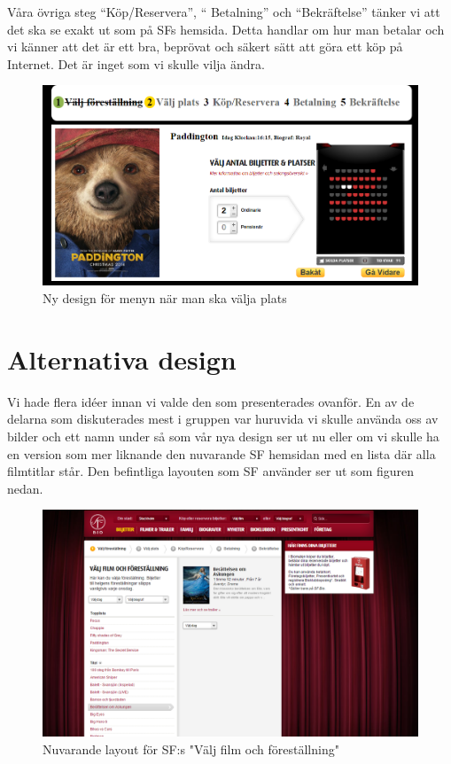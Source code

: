 \documentclass[swedish,a4paper,11pt]{article}
\begin{document}
Våra övriga steg “Köp/Reservera”, “ Betalning” och “Bekräftelse” tänker vi att det ska se exakt ut som på SFs hemsida. Detta handlar om hur man betalar och vi känner att det är ett bra, beprövat och säkert sätt att göra ett köp på Internet. Det är inget som vi skulle vilja ändra.
\begin{figure}[H]
\centering
\includegraphics[scale=0.27]{valdplats.png} 
\caption{Ny design för menyn när man ska välja plats}
\end{figure}

\newpage
\section{Alternativa design} 
Vi hade flera idéer innan vi valde den som presenterades ovanför. En av de delarna som diskuterades mest i gruppen var huruvida vi skulle använda oss av bilder och ett namn under så som vår nya design ser ut nu eller om vi skulle ha en version som mer liknande den nuvarande SF hemsidan med en lista där alla filmtitlar står. Den befintliga layouten som SF använder ser ut som figuren nedan. 

\begin{figure}[H]
\centering
\includegraphics[scale=0.45]{LISTVY.png} 
\caption{Nuvarande layout för SF:s "Välj film och föreställning"}
\end{figure}
\end{document}
